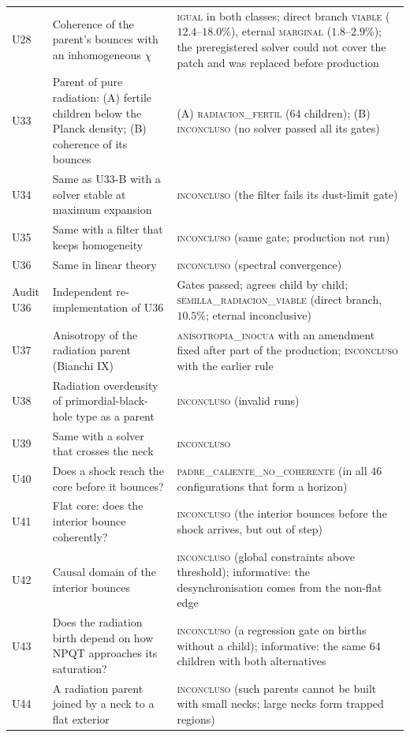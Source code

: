 \documentclass[11pt,a4paper]{article}
\begin{document}
\begin{small}
\begin{longtable}{L{1.3cm}L{6.0cm}L{7.6cm}}
U28 & Coherence of the parent's bounces with an inhomogeneous $\chi$ & \textsc{igual} in both classes; direct branch \textsc{viable} ($12.4$--$18.0\%$), eternal \textsc{marginal} ($1.8$--$2.9\%$); the preregistered solver could not cover the patch and was replaced before production \\
U33 & Parent of pure radiation: (A) fertile children below the Planck density; (B) coherence of its bounces & (A) \textsc{radiacion\_fertil} ($64$ children); (B) \textsc{inconcluso} (no solver passed all its gates) \\
U34 & Same as U33-B with a solver stable at maximum expansion & \textsc{inconcluso} (the filter fails its dust-limit gate) \\
U35 & Same with a filter that keeps homogeneity & \textsc{inconcluso} (same gate; production not run) \\
U36 & Same in linear theory & \textsc{inconcluso} (spectral convergence) \\
Audit U36 & Independent re-implementation of U36 & Gates passed; agrees child by child; \textsc{semilla\_radiacion\_viable} (direct branch, $10.5\%$; eternal inconclusive) \\
U37 & Anisotropy of the radiation parent (Bianchi IX) & \textsc{anisotropia\_inocua} with an amendment fixed after part of the production; \textsc{inconcluso} with the earlier rule \\
U38 & Radiation overdensity of primordial-black-hole type as a parent & \textsc{inconcluso} (invalid runs) \\
U39 & Same with a solver that crosses the neck & \textsc{inconcluso} \\
U40 & Does a shock reach the core before it bounces? & \textsc{padre\_caliente\_no\_coherente} (in all $46$ configurations that form a horizon) \\
U41 & Flat core: does the interior bounce coherently? & \textsc{inconcluso} (the interior bounces before the shock arrives, but out of step) \\
U42 & Causal domain of the interior bounces & \textsc{inconcluso} (global constraints above threshold); informative: the desynchronisation comes from the non-flat edge \\
U43 & Does the radiation birth depend on how NPQT approaches its saturation? & \textsc{inconcluso} (a regression gate on births without a child); informative: the same $64$ children with both alternatives \\
U44 & A radiation parent joined by a neck to a flat exterior & \textsc{inconcluso} (such parents cannot be built with small necks; large necks form trapped regions) \\

\end{longtable}
\end{small}
\end{document}
